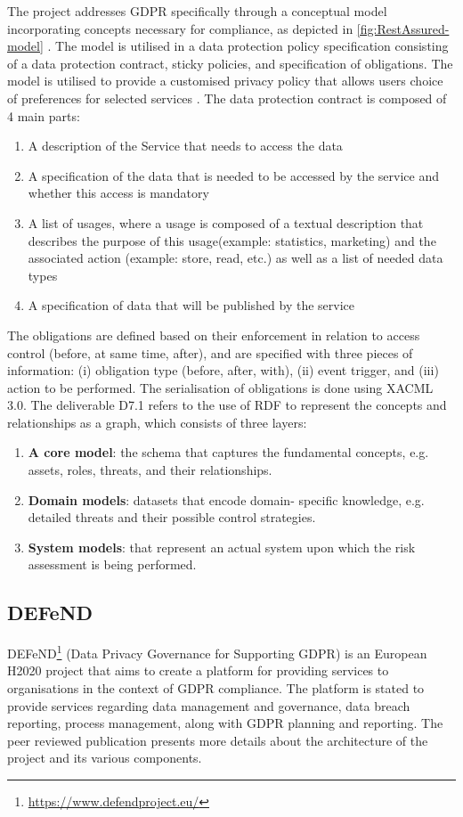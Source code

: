 The project addresses GDPR specifically through a conceptual model incorporating concepts necessary for compliance, as depicted in \autoref{fig:RestAssured-model} \cite{noauthor_d6.1.pdf_nodate}. The model is utilised in a data protection policy specification consisting of a data protection contract, sticky policies, and specification of obligations. The model is utilised to provide a customised privacy policy that allows users choice of preferences for selected services \cite{gritzalis_privacy_2019}. The data protection contract is composed of 4 main parts:
\begin{enumerate}
    \item A description of the Service that needs to access the data
    \item A specification of the data that is needed to be accessed by the service and whether this access is mandatory
    \item A list of usages, where a usage is composed of a textual description that describes the purpose of this usage(example: statistics, marketing) and the associated action (example: store, read, etc.) as well as a list of needed data types
    \item A specification of data that will be published by the service
\end{enumerate}
The obligations are defined based on their enforcement in relation to access control (before, at same time, after), and are specified with three pieces of information: (i) obligation type (before, after, with), (ii) event trigger, and (iii) action to be performed. The serialisation of obligations is done using XACML 3.0.
The deliverable D7.1 \cite{noauthor_d7.1.pdf_nodate} refers to the use of RDF to represent the concepts and relationships as a graph, which consists of three layers:
\begin{enumerate}
    \item \textbf{A core model}: the schema that captures the fundamental concepts, e.g. assets, roles, threats, and their relationships.
    \item \textbf{Domain models}: datasets that encode domain- specific knowledge, e.g. detailed threats and their possible control strategies.
    \item \textbf{System models}: that represent an actual system upon which the risk assessment is being performed.
\end{enumerate}

\subsection{DEFeND}
DEFeND\footnote{\url{https://www.defendproject.eu/}} (Data Privacy Governance for Supporting GDPR) is an European H2020 project that aims to create a platform for providing services to organisations in the context of GDPR compliance. The platform is stated to provide services regarding data management and governance, data breach reporting, process management, along with GDPR planning and reporting. The peer reviewed publication \cite{piras_defend_2019} presents more details about the architecture of the project and its various components.

